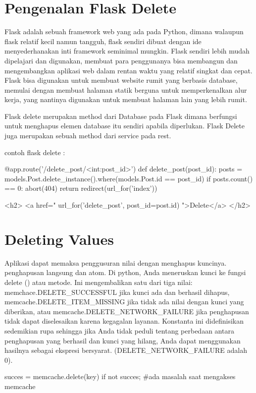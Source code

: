 \section{Pengenalan Flask Delete}
Flask adalah sebuah framework web yang ada pada Python, dimana walaupun flask relatif kecil namun tangguh, flask sendiri dibuat dengan ide menyederhanakan inti framework seminimal mungkin.  Flask sendiri lebih mudah dipelajari dan digunakan, membuat para penggunanya bisa membangun dan mengembangkan aplikasi web dalam rentan waktu yang relatif singkat dan cepat. Flask bisa digunakan  untuk membuat website rumit yang berbasis database, memulai dengan membuat halaman statik berguna untuk memperkenalkan alur kerja, yang nantinya digunakan untuk membuat halaman lain yang lebih rumit.

Flask delete merupakan method dari Database pada Flask dimana berfungsi untuk menghapus elemen database itu sendiri apabila diperlukan. Flask Delete juga merupakan
sebuah method dari service pada rest.

contoh flask delete :

@app.route('/delete_post/<int:post_id>')
def delete_post(post_id):
    posts = models.Post.delete_instance().where(models.Post.id == post_id)
    if posts.count() == 0:
        abort(404)
    return redirect(url_for('index'))


<h2>
    <a href="{{ url_for('delete_post', post_id=post.id) }}">Delete</a>
</h2>

\section{Deleting Values}
Aplikasi dapat memaksa penggusuran nilai dengan menghapus kuncinya. penghapusan langsung dan atom.
Di python, Anda meneruskan kunci ke fungsi delete () atau metode. Ini mengembalikan satu dari tiga nilai: memchace.DELETE_SUCCESSFUL jika kunci ada dan berhasil dihapus, memcache.DELETE_ITEM_MISSING jika tidak ada nilai dengan kunci yang diberikan, atau memcache.DELETE_NETWORK_FAILURE jika penghapusan tidak dapat diselesaikan karena kegagalan layanan. Konstanta ini didefinisikan sedemikian rupa sehingga jika Anda tidak peduli tentang perbedaan antara penghapusan yang berhasil dan kunci yang hilang, Anda dapat menggunakan hasilnya sebagai ekspresi bersyarat. (DELETE_NETWORK_FAILURE adalah 0)\cite{sanderson2015programming}.

		succes = memcache.delete(key)
		if not succes;
			#ada masalah saat mengakses memcache

